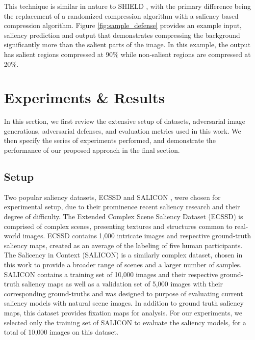 \documentclass[10pt,twocolumn,letterpaper]{article}
\begin{document}
This technique is similar in nature to SHIELD \cite{das2018shield}, with the primary difference being the replacement of a randomized compression algorithm with a saliency based compression algorithm.
Figure \ref{fig:sample_defense} provides an example input, saliency prediction and output that demonstrates compressing the background significantly more than the salient parts of the image. In this example, the output has salient regions compressed at 90\% while non-salient regions are compressed at 20\%. 



\section{Experiments \& Results}
In this section, we first review the extensive setup of datasets, adversarial image generations, adversarial defenses, and evaluation metrics used in this work.
We then specify the series of experiments performed, and demonstrate the performance of our proposed approach in the final section.


\subsection{Setup}

Two popular saliency datasets, ECSSD \cite{ECSSD} and SALICON \cite{jiang2015salicon}, were chosen for experimental setup, due to their prominence recent saliency research and their degree of difficulty. 
The Extended Complex Scene Saliency Dataset (ECSSD) \cite{ECSSD} is comprised of complex scenes, presenting textures and structures common to real-world images.
ECSSD \cite{ECSSD} contains 1,000 intricate images and respective ground-truth saliency maps, created as an average of the labeling of five human participants.
The Salicency in Context (SALICON) \cite{jiang2015salicon} is a similarly complex dataset, chosen in this work to provide a broader range of scenes and a larger number of samples.
SALICON \cite{jiang2015salicon} contains a training set of 10,000 images and their respective ground-truth saliency maps as well as a validation set of 5,000 images with their corresponding ground-truths and was designed to purpose of evaluating current saliency models with natural scene images.
In addition to ground truth saliency maps, this dataset provides fixation maps for analysis. 
For our experiments, we selected only the training set of SALICON \cite{jiang2015salicon} to evaluate the saliency models, for a total of 10,000 images on this dataset.
\end{document}
